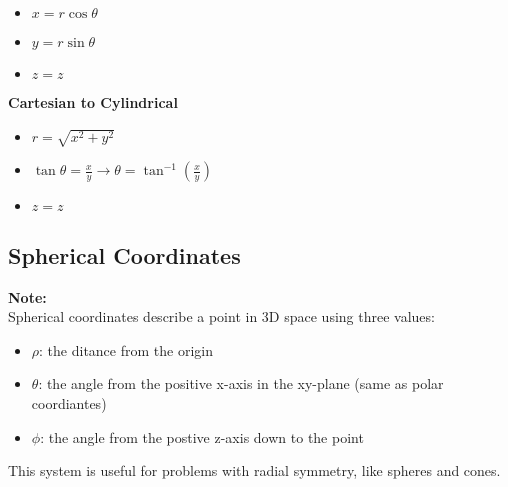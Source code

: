 \documentclass[10pt]{article}                               %
\begin{document}
\begin{tcolorbox}
\begin{adjustwidth}{2em}{0pt}
\begin{adjustwidth}{2em}{0pt}
            \begin{itemize}
                \item \( x = r\cos\theta \)
                \item \( y = r\sin\theta \)
                \item \( z = z \)
            \end{itemize}

            \vspace{0.5em}

            \textbf{Cartesian to Cylindrical}

            \begin{itemize}
                \item \( r = \sqrt{x^2 + y^2} \)
                \item \( \tan\theta = \frac{x}{y}  \rightarrow  \theta = \tan^{-1}\left(\frac{x}{y}\right) \)
                \item \( z = z \)
            \end{itemize}

        \end{adjustwidth}


        \subsection*{Spherical Coordinates}

        \begin{adjustwidth}{2em}{0pt}

            \begin{tcolorbox}[enhanced, colback=white, colframe=black, boxrule=0.5pt]

                \textbf{Note:} \\
                Spherical coordinates describe a point in 3D space using three values:
                        
                \begin{itemize}
                    \item \( \rho \): the ditance from the origin
                    \item \( \theta \): the angle from the positive x-axis in the xy-plane (same as polar coordiantes)
                    \item \( \phi \): the angle from the postive z-axis down to the point
                \end{itemize}

                This system is useful for problems with radial symmetry, like spheres and cones.


\end{tcolorbox}
\end{adjustwidth}
\end{adjustwidth}
\end{tcolorbox}
\end{document}
